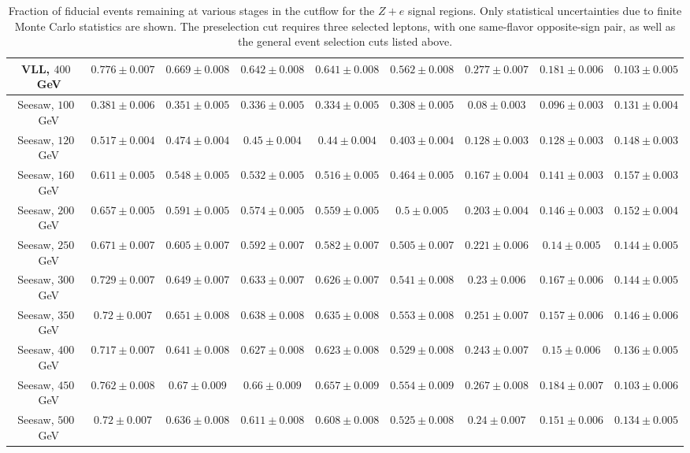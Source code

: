 \begin{table}[ht]
{\begin{tabular}{|c|c|c|c|c|c||c|c|c|}
		\hline
		VLL, $400$~GeV		&	$0.776 \pm 0.007$	&	$0.669 \pm 0.008$	&	$0.642 \pm 0.008$	&	$0.641 \pm 0.008$	&	$0.562 \pm 0.008$	&	$0.277 \pm 0.007$ &	$0.181 \pm 0.006$	&	$0.103 \pm 0.005$	\\
		\hline
		Seesaw, $100$~GeV	&	$0.381 \pm 0.006$	&	$0.351 \pm 0.005$	&	$0.336 \pm 0.005$	&	$0.334 \pm 0.005$	&	$0.308 \pm 0.005$	&	$0.08 \pm 0.003$ &	$0.096 \pm 0.003$	&	$0.131 \pm 0.004$	\\
		\hline
		Seesaw, $120$~GeV	&	$0.517 \pm 0.004$	&	$0.474 \pm 0.004$	&	$0.45 \pm 0.004$	&	$0.44 \pm 0.004$	&	$0.403 \pm 0.004$	&	$0.128 \pm 0.003$ &	$0.128 \pm 0.003$	&	$0.148 \pm 0.003$	\\
		\hline
		Seesaw, $160$~GeV	&	$0.611 \pm 0.005$	&	$0.548 \pm 0.005$	&	$0.532 \pm 0.005$	&	$0.516 \pm 0.005$	&	$0.464 \pm 0.005$	&	$0.167 \pm 0.004$ &	$0.141 \pm 0.003$	&	$0.157 \pm 0.003$	\\
		\hline
		Seesaw, $200$~GeV	&	$0.657 \pm 0.005$	&	$0.591 \pm 0.005$	&	$0.574 \pm 0.005$	&	$0.559 \pm 0.005$	&	$0.5 \pm 0.005$		&	$0.203 \pm 0.004$ &	$0.146 \pm 0.003$	&	$0.152 \pm 0.004$	\\
		\hline
		Seesaw, $250$~GeV	&	$0.671 \pm 0.007$	&	$0.605 \pm 0.007$	&	$0.592 \pm 0.007$	&	$0.582 \pm 0.007$	&	$0.505 \pm 0.007$	&	$0.221 \pm 0.006$ &	$0.14 \pm 0.005$	&	$0.144 \pm 0.005$	\\
		\hline
		Seesaw, $300$~GeV	&	$0.729 \pm 0.007$	&	$0.649 \pm 0.007$	&	$0.633 \pm 0.007$	&	$0.626 \pm 0.007$	&	$0.541 \pm 0.008$	&	$0.23 \pm 0.006$ &	$0.167 \pm 0.006$	&	$0.144 \pm 0.005$	\\
		\hline
		Seesaw, $350$~GeV	&	$0.72 \pm 0.007$	&	$0.651 \pm 0.008$	&	$0.638 \pm 0.008$	&	$0.635 \pm 0.008$	&	$0.553 \pm 0.008$	&	$0.251 \pm 0.007$ &	$0.157 \pm 0.006$	&	$0.146 \pm 0.006$	\\
		\hline
		Seesaw, $400$~GeV	&	$0.717 \pm 0.007$	&	$0.641 \pm 0.008$	&	$0.627 \pm 0.008$	&	$0.623 \pm 0.008$	&	$0.529 \pm 0.008$	&	$0.243 \pm 0.007$ &	$0.15 \pm 0.006$	&	$0.136 \pm 0.005$	\\
		\hline
		Seesaw, $450$~GeV	&	$0.762 \pm 0.008$	&	$0.67 \pm 0.009$	&	$0.66 \pm 0.009$	&	$0.657 \pm 0.009$	&	$0.554 \pm 0.009$	&	$0.267 \pm 0.008$ &	$0.184 \pm 0.007$	&	$0.103 \pm 0.006$	\\
		\hline
		Seesaw, $500$~GeV	&	$0.72 \pm 0.007$	&	$0.636 \pm 0.008$	&	$0.611 \pm 0.008$	&	$0.608 \pm 0.008$	&	$0.525 \pm 0.008$	&	$0.24 \pm 0.007$ &	$0.151 \pm 0.006$	&	$0.134 \pm 0.005$	\\
		\hline
	\end{tabular}
	}
	\caption{Fraction of fiducial events remaining at various stages in the cutflow for the $Z+e$ signal regions. Only statistical uncertainties due to finite Monte Carlo statistics are shown. The preselection cut requires three selected leptons, with one same-flavor opposite-sign pair, as well as the general event selection cuts listed above.}
	\label{table:fiducial-efficiencies-Ze}
\end{table}

